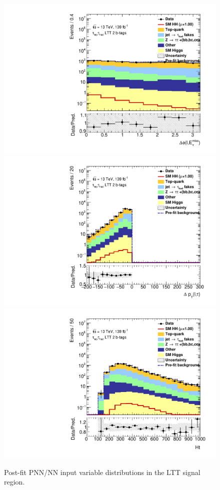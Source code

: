 \begin{figure}[htbp]
\includegraphics[width=.32\textwidth]{diHiggs/plots/MVA/postfit/Region_BMin0_incJet1_distdPhiLep0MET_J2_D_T2_SpcTauLH_Y2015_LTT1_L1_GlobalFit_conditionnal_mu0log.pdf} \\
\includegraphics[width=.32\textwidth]{diHiggs/plots/MVA/postfit/Region_BMin0_incJet1_distdPtLepTau_J2_D_T2_SpcTauLH_Y2015_LTT1_L1_GlobalFit_conditionnal_mu0log.pdf}
\includegraphics[width=.32\textwidth]{diHiggs/plots/MVA/postfit/Region_BMin0_incJet1_distHt_J2_D_T2_SpcTauLH_Y2015_LTT1_L1_GlobalFit_conditionnal_mu0log.pdf}
\caption{Post-fit PNN/NN input variable distributions in the LTT signal region.}
\label{fig:lttmvainputspostfit}
\end{figure}



